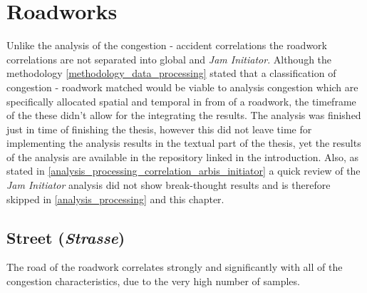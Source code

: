 \section{Roadworks}
Unlike the analysis of the congestion - accident correlations the roadwork correlations are not separated into global and \textit{Jam Initiator}. Although the methodology \cref{methodology_data_processing} stated that a classification of congestion - roadwork matched would be viable to analysis congestion which are specifically allocated spatial and temporal in from of a roadwork, the timeframe of the these didn't allow for the integrating the results. The analysis was finished just in time of finishing the thesis, however this did not leave time for implementing the analysis results in the textual part of the thesis, yet the results of the analysis are available in the repository linked in the introduction. Also, as stated in \cref{analysis_processing_correlation_arbis_initiator} a quick review of the \textit{Jam Initiator} analysis did not show break-thought results and is therefore skipped in \cref{analysis_processing} and this chapter.

\subsection{Street (\textit{Strasse})}
\label{analysis_arbis_sum_Strasse}
The road of the roadwork correlates strongly and significantly with all of the congestion characteristics, due to the very high number of samples. 

